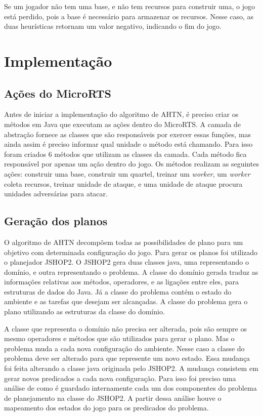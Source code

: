 Se um jogador não tem uma base, e não tem recursos para construir uma, o jogo está perdido, pois a base é necessário para armazenar os recursos. 
Nesse caso, as duas heurísticas retornam um valor negativo, indicando o fim do jogo. 

\section{Implementação}

\subsection{Ações do MicroRTS}

Antes de iniciar a implementação do algoritmo de AHTN, é preciso criar os métodos em Java que executam as ações dentro do MicroRTS.
A camada de abstração fornece as classes que são responsáveis por exercer essas funções, mas ainda assim é preciso informar qual unidade o método está chamando.
Para isso foram criados 6 métodos que utilizam as classes da camada.
Cada método fica responsável por apenas um ação dentro do jogo.
Os métodos realizam as seguintes ações: construir uma base, construir um quartel, treinar um \textit{worker}, um \textit{worker} coleta recursos, treinar unidade de ataque, e uma unidade de ataque procura unidades adversárias para atacar.

\subsection{Geração dos planos}

O algoritmo de AHTN decompõem todas as possibilidades de plano para um objetivo com determinada configuração do jogo.
Para gerar os planos foi utilizado o planejador JSHOP2.
O JSHOP2 gera duas classes java, uma representando o domínio, e outra representando o problema.
A classe do domínio gerada traduz as informações relativas aos métodos, operadores, e as ligações entre eles, para estruturas de dados do Java.
Já a classe do problema contém o estado do ambiente e as tarefas que desejam ser alcançadas.
A classe do problema gera o plano utilizando as estruturas da classe do domínio.

A classe que representa o domínio não precisa ser alterada, pois são sempre os mesmo operadores e métodos que são utilizados para gerar o plano.
Mas o problema muda a cada nova configuração do ambiente.
Nesse caso a classe do problema deve ser alterado para que represente um novo estado.
Essa mudança foi feita alterando a classe java originada pelo JSHOP2. 
A mudança consistem em gerar novos predicados a cada nova configuração.
Para isso foi preciso uma análise de como é guardado internamente cada um dos componentes do problema de planejamento na classe do JSHOP2.
A partir dessa análise houve o mapeamento dos estados do jogo para os predicados do problema.

